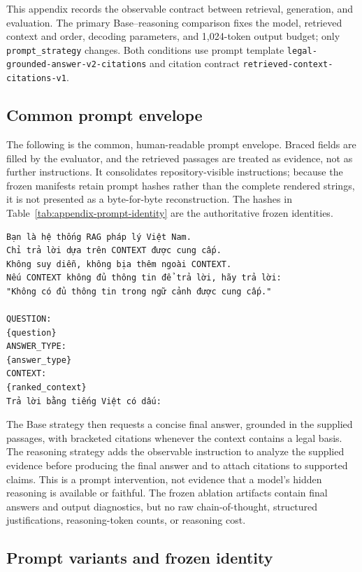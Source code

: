 This appendix records the observable contract between retrieval, generation,
and evaluation. The primary Base--reasoning comparison fixes the model,
retrieved context and order, decoding parameters, and 1,024-token output budget;
only \texttt{prompt\_strategy} changes. Both conditions use prompt template
\texttt{legal-grounded-answer-v2-citations} and citation contract
\texttt{retrieved-context-citations-v1}.

\subsection{Common prompt envelope}

The following is the common, human-readable prompt envelope. Braced fields are
filled by the evaluator, and the retrieved passages are treated as evidence,
not as further instructions. It consolidates repository-visible instructions;
because the frozen manifests retain prompt hashes rather than the complete
rendered strings, it is not presented as a byte-for-byte reconstruction. The
hashes in Table~\ref{tab:appendix-prompt-identity} are the authoritative frozen
identities.

{\scriptsize
\begin{verbatim}
Bạn là hệ thống RAG pháp lý Việt Nam.
Chỉ trả lời dựa trên CONTEXT được cung cấp.
Không suy diễn, không bịa thêm ngoài CONTEXT.
Nếu CONTEXT không đủ thông tin để trả lời, hãy trả lời:
"Không có đủ thông tin trong ngữ cảnh được cung cấp."

QUESTION:
{question}
ANSWER_TYPE:
{answer_type}
CONTEXT:
{ranked_context}
Trả lời bằng tiếng Việt có dấu:
\end{verbatim}
}

The Base strategy then requests a concise final answer, grounded in the supplied
passages, with bracketed citations whenever the context contains a legal basis.
The reasoning strategy adds the observable instruction to analyze the supplied
evidence before producing the final answer and to attach citations to supported
claims. This is a prompt intervention, not evidence that a model's hidden
reasoning is available or faithful. The frozen ablation artifacts contain final
answers and output diagnostics, but no raw chain-of-thought, structured
justifications, reasoning-token counts, or reasoning cost.

\subsection{Prompt variants and frozen identity}

